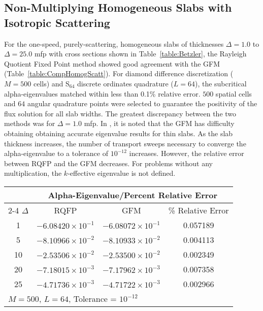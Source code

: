 \subsection{Non-Multiplying Homogeneous Slabs with Isotropic Scattering}
For the one-speed, purely-scattering, homogeneous slabs of thicknesses $\Delta = 1.0$ to $\Delta = 25.0$ mfp with cross sections shown in Table~\ref{table:Betzler}, the Rayleigh Quotient Fixed Point method showed good agreement with the GFM (Table~\ref{table:CompHomogScatt}). For diamond difference discretization ($M = 500$ cells) and S$_{64}$ discrete ordinates quadrature ($L = 64$), the subcritical alpha-eigenvalues matched within less than 0.1\% relative error. $500$ spatial cells and $64$ angular quadrature points were selected to guarantee the positivity of the flux solution for all slab widths. The greatest discrepancy between the two methods was for $\Delta = 1.0$ mfp. In \cite{kornreich_timeeigenvalue_2005}, it is noted that the GFM has difficulty obtaining obtaining accurate eigenvalue results for thin slabs. As the slab thickness increases, the number of transport sweeps necessary to converge the alpha-eigenvalue to a tolerance of $10^{-12}$ increases. However, the relative error between RQFP and the GFM decreases. For problems without any multiplication, the $k$-effective eigenvalue is not defined.

\begin{table*}[!htbp]
\centering{}
\caption{Comparison of RQFP- and GFM-calculated Alpha-Eigenvalues for a Homogeneous Scattering Slab}
\label{table:CompHomogScatt}
\begin{tabular}{@{}cccc@{}}\toprule
& \multicolumn{3}{c}{Alpha-Eigenvalue/Percent Relative Error} \\
\cmidrule{2-4} $\Delta$ & RQFP & GFM & \% Relative Error \\
\midrule
1 & $-6.08420 \times 10^{-1}$ & $-6.08072 \times 10^{-1}$ & 0.057189 \\ 
5 & $-8.10966 \times 10^{-2}$ & $-8.10933 \times 10^{-2}$ & 0.004113 \\ 
10 & $-2.53506 \times 10^{-2}$ & $-2.53500 \times 10^{-2}$ & 0.002349 \\ 
20 & $-7.18015 \times 10^{-3}$ & $-7.17962 \times 10^{-3}$ & 0.007358 \\ 
25 & $-4.71736 \times 10^{-3}$ & $-4.71722 \times 10^{-3}$ & 0.002966 \\ 
\bottomrule
\multicolumn{4}{l}{$M = 500$, $L = 64$, Tolerance = $10^{-12}$} \\
\end{tabular}
\end{table*}

